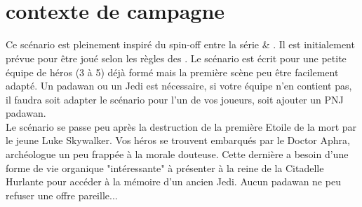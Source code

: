 \documentclass{jdrp}
\begin{document}
	\begin{titlepage}

	\begin{center}
		\hspace*{\vfill}
		\noindent\Huge{}\\ 
		\noindent\fontsize{50}{70}\jedifont{\$}
		\noindent\fontsize{50}{70}\jedifont{\#}\\
		\noindent\fontsize{50}{60}
		\hspace*{\vfill}
	\end{center}


	\noindent{}
	\end{titlepage}

	\onecolumn
	\section{contexte de campagne}
	
	Ce scénario est pleinement inspiré du spin-off entre la série  & . Il est initialement prévue pour être joué selon les règles des . Le scénario est écrit pour une petite équipe de héros (3 à 5) déjà formé mais la première scène peu être facilement adapté. Un padawan ou un Jedi est nécessaire, si votre équipe n’en contient pas, il faudra soit adapter le scénario pour l’un de vos joueurs, soit ajouter un PNJ padawan.\\

    Le scénario se passe peu après la destruction de la première Etoile de la mort par le jeune Luke Skywalker. Vos héros se trouvent embarqués par le Doctor Aphra, archéologue un peu frappée à la morale douteuse. Cette dernière a besoin d’une forme de vie organique "intéressante" à présenter à la reine de la Citadelle Hurlante pour accéder à la mémoire d’un ancien Jedi. Aucun padawan ne peu refuser une offre pareille...

	\twocolumn

	
	
	
    

	\onecolumn
	\nocite{*}
	\printbibliography
\end{document}
